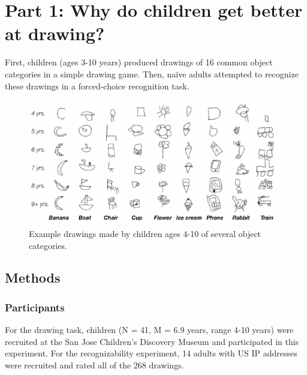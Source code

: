 \documentclass[10pt, letterpaper]{article}
\newenvironment{CodeChunk}{}{}
\begin{document}
\section{Part 1: Why do children get better at
drawing?}\label{part-1-why-do-children-get-better-at-drawing}

First, children (ages 3-10 years) produced drawings of 16 common object
categories in a simple drawing game. Then, naïve adults attempted to
recognize these drawings in a forced-choice recognition task.

\begin{CodeChunk}
\begin{figure}[h]

{\centering \includegraphics[width=1\linewidth]{figs/exampleDrawings-1} 

}

\caption[Example drawings made by children ages 4-10 of several object  categories]{Example drawings made by children ages 4-10 of several object  categories.}\label{fig:exampleDrawings}
\end{figure}
\end{CodeChunk}

\subsection{Methods}\label{methods}

\subsubsection{Participants}\label{participants}

For the drawing task, children (N = 41, M = 6.9 years, range 4-10 years)
were recruited at the San Jose Children's Discovery Museum and
participated in this experiment. For the recognizability experiment, 14
adults with US IP addresses were recruited and rated all of the 268
drawings.
\end{document}
